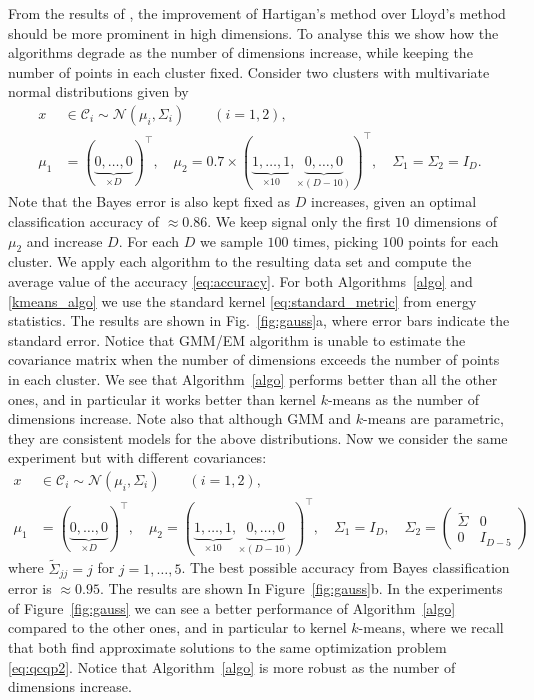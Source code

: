 \documentclass[aps,preprint,nofootinbib,floatfix]{revtex4-1}
\newcommand\C{{\mathcal{C}}}
\begin{document}
From the results of \cite{Telgarsky}, the improvement of Hartigan's method
over Lloyd's method should be more prominent in high dimensions.
To analyse this we show 
how the algorithms degrade as the number of dimensions increase, while
keeping the number of points in each cluster fixed. Consider
two clusters with multivariate normal distributions given by
\begin{equation}
\label{eq:gauss1}
\begin{split}
x &\in \C_i  \sim 
\mathcal{N}(\mu_i,\Sigma_i) \qquad (i=1,2),  \\
\mu_1 &= (\underbrace{0,\dotsc,0}_{\times D})^\top , \quad
\mu_2 = 0.7 \times (\underbrace{1,\dots,1}_{\times 10},
\underbrace{0,\dots,0}_{\times (D-10)})^\top, \quad
\Sigma_1 = \Sigma_2 = I_D.
\end{split}
\end{equation}
Note that the Bayes error
is also kept fixed as $D$ increases, given an optimal classification
accuracy of $\approx 0.86$.
We keep signal only the first $10$ dimensions of $\mu_2$ and increase $D$.
For each $D$ we sample $100$ times, picking $100$ points for each cluster.
We apply each algorithm to the resulting data set 
and compute the average value of the accuracy \eqref{eq:accuracy}.
For both Algorithms~\ref{algo} and \ref{kmeans_algo} we use the standard
kernel \eqref{eq:standard_metric} from energy statistics.
The results are shown in Fig.~\ref{fig:gauss}a, where error bars indicate
the standard error.
Notice that GMM/EM algorithm is unable to estimate the covariance matrix 
when the number of dimensions exceeds the number of points in each cluster.
We see that Algorithm~\ref{algo} performs better than all the other ones,
and in particular it works better than kernel $k$-means as the number
of dimensions increase. Note also that although GMM and $k$-means are
parametric, they are consistent models for the above distributions.
Now we consider the same experiment but with different covariances:
\begin{equation}
\label{eq:gauss2}
\begin{split}
x &\in \C_i  \sim 
\mathcal{N}(\mu_i,\Sigma_i) \qquad (i=1,2),  \\
\mu_1 &= (\underbrace{0,\dotsc,0}_{\times D})^\top , \quad
\mu_2 = (\underbrace{1,\dots,1}_{\times 10},
\underbrace{0,\dots,0}_{\times (D-10)})^\top, \quad
\Sigma_1 = I_D, \quad 
\Sigma_2 = \left( \begin{smallmatrix} \widetilde{\Sigma} & 0 \\ 0 & I_{D-5}
\end{smallmatrix}\right)
\end{split}
\end{equation}
where $\widetilde{\Sigma}_{jj} = j$ for $j=1,\dotsc,5$.
The best possible accuracy from Bayes classification error is
$\approx 0.95$.
The results are shown In Figure~\ref{fig:gauss}b.
In the experiments of Figure~\ref{fig:gauss}
we can see a better performance of Algorithm~\ref{algo} compared
to the other ones, and in particular to kernel $k$-means,
where we recall that both find approximate solutions
to the same optimization problem \eqref{eq:qcqp2}.
Notice that Algorithm~\ref{algo} is more robust as the number of dimensions
increase.
\end{document}
